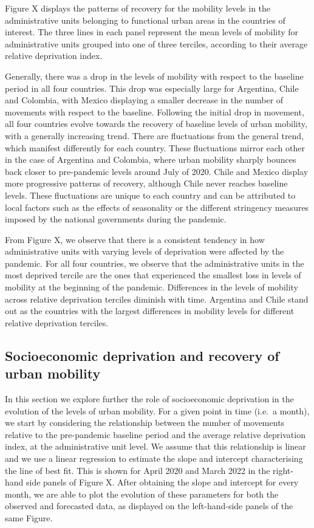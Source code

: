 \documentclass[
  11pt,
]{article}
\begin{document}
Figure X displays the patterns of recovery for the mobility levels in
the administrative units belonging to functional urban areas in the
countries of interest. The three lines in each panel represent the mean
levels of mobility for administrative units grouped into one of three
terciles, according to their average relative deprivation index.

Generally, there was a drop in the levels of mobility with respect to
the baseline period in all four countries. This drop was especially
large for Argentina, Chile and Colombia, with Mexico displaying a
smaller decrease in the number of movements with respect to the
baseline. Following the initial drop in movement, all four countries
evolve towards the recovery of baseline levels of urban mobility, with a
generally increasing trend. There are fluctuations from the general
trend, which manifest differently for each country. These fluctuations
mirror each other in the case of Argentina and Colombia, where urban
mobility sharply bounces back closer to pre-pandemic levels around July
of 2020. Chile and Mexico display more progressive patterns of recovery,
although Chile never reaches baseline levels. These fluctuations are
unique to each country and can be attributed to local factors such as
the effects of seasonality or the different stringency measures imposed
by the national governments during the pandemic.

From Figure X, we observe that there is a consistent tendency in how
administrative units with varying levels of deprivation were affected by
the pandemic. For all four countries, we observe that the administrative
units in the most deprived tercile are the ones that experienced the
smallest loss in levels of mobility at the beginning of the pandemic.
Differences in the levels of mobility across relative deprivation
terciles diminish with time. Argentina and Chile stand out as the
countries with the largest differences in mobility levels for different
relative deprivation terciles.

\subsection{Socioeconomic deprivation and recovery of urban
mobility}\label{socioeconomic-deprivation-and-recovery-of-urban-mobility}

In this section we explore further the role of socioeconomic deprivation
in the evolution of the levels of urban mobility. For a given point in
time (i.e.~a month), we start by considering the relationship between
the number of movements relative to the pre-pandemic baseline period and
the average relative deprivation index, at the administrative unit
level. We assume that this relationship is linear and we use a linear
regression to estimate the slope and intercept characterising the line
of best fit. This is shown for April 2020 and March 2022 in the
right-hand side panels of Figure X. After obtaining the slope and
intercept for every month, we are able to plot the evolution of these
parameters for both the observed and forecasted data, as displayed on
the left-hand-side panels of the same Figure.
\end{document}
